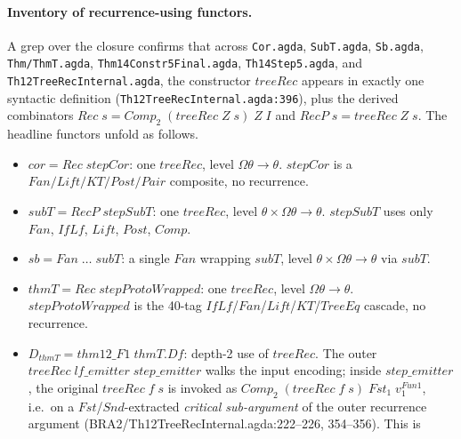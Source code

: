 \documentclass[11pt]{article}
\begin{document}
\paragraph{Inventory of recurrence-using functors.}
A grep over the closure confirms that across
\verb|Cor.agda|, \verb|SubT.agda|, \verb|Sb.agda|, \verb|Thm/ThmT.agda|,
\verb|Thm14Constr5Final.agda|, \verb|Th14Step5.agda|, and
\verb|Th12TreeRecInternal.agda|, the constructor $\mathit{treeRec}$
appears in exactly one syntactic definition
(\verb|Th12TreeRecInternal.agda:396|), plus the derived combinators
$\mathit{Rec}\;s = \mathit{Comp}_2\;(\mathit{treeRec}\;Z\;s)\;Z\;I$ and
$\mathit{RecP}\;s = \mathit{treeRec}\;Z\;s$.  The headline functors
unfold as follows.
\begin{itemize}
  \item $\mathit{cor} = \mathit{Rec}\;\mathit{stepCor}$: one
        $\mathit{treeRec}$, level $\Omega\theta \to \theta$.
        $\mathit{stepCor}$ is a $\mathit{Fan}/\mathit{Lift}/\mathit{KT}/\mathit{Post}/\mathit{Pair}$
        composite, no recurrence.
  \item $\mathit{subT} = \mathit{RecP}\;\mathit{stepSubT}$: one
        $\mathit{treeRec}$, level
        $\theta \times \Omega\theta \to \theta$.  $\mathit{stepSubT}$
        uses only $\mathit{Fan}$, $\mathit{IfLf}$, $\mathit{Lift}$,
        $\mathit{Post}$, $\mathit{Comp}$.
  \item $\mathit{sb} = \mathit{Fan}\;\ldots\;\mathit{subT}$: a single
        $\mathit{Fan}$ wrapping $\mathit{subT}$, level
        $\theta \times \Omega\theta \to \theta$ via $\mathit{subT}$.
  \item $\mathit{thmT} = \mathit{Rec}\;\mathit{stepProtoWrapped}$:
        one $\mathit{treeRec}$, level $\Omega\theta \to \theta$.
        $\mathit{stepProtoWrapped}$ is the 40-tag
        $\mathit{IfLf}$/$\mathit{Fan}$/$\mathit{Lift}$/$\mathit{KT}$/$\mathit{TreeEq}$
        cascade, no recurrence.
  \item $D_{\mathit{thmT}} = \mathit{thm12\_F1}\;\mathit{thmT}.\mathit{Df}$:
        depth-2 use of $\mathit{treeRec}$.  The outer
        $\mathit{treeRec}\;\mathit{lf\_emitter}\;\mathit{step\_emitter}$
        walks the input encoding; inside $\mathit{step\_emitter}$, the
        original $\mathit{treeRec}\;f\;s$ is invoked as
        $\mathit{Comp}_2\;(\mathit{treeRec}\;f\;s)\;\mathit{Fst}_1\;v_1^{\mathit{Fun1}}$,
        i.e.\ on a $\mathit{Fst}$/$\mathit{Snd}$-extracted
        \emph{critical sub-argument} of the outer recurrence argument
        (BRA2/Th12TreeRecInternal.agda:222--226, 354--356).  This is

\end{itemize}
\end{document}
